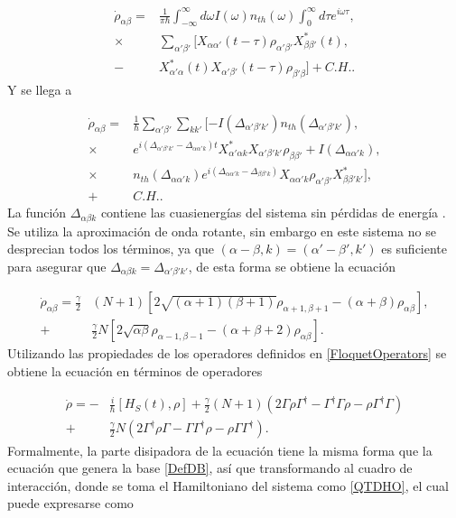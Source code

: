 \documentclass[a4paper,10pt]{report}
\begin{document}
\begin{align*}
\dot{\rho}_{\alpha \beta} =& \frac{1}{\pi \hbar} \int_{-\infty}^\infty d\omega I(\omega)n_{th}(\omega) \int_0 ^{\infty} d\tau e^{i\omega \tau}, \\
 \times & \sum_{\alpha' \beta '} [X_{\alpha \alpha'}(t-\tau)\rho_{\alpha' \beta'}X^* _{\beta \beta'}(t),\\
 -& X^* _{\alpha' \alpha}(t) X_{\alpha' \beta'}(t-\tau)\rho_{\beta' \beta}] + C.H..
\end{align*} Y se llega a

\begin{align*}
\dot{\rho}_{\alpha \beta} =& \frac{1}{\hbar} \sum_{\alpha' \beta'}\sum_{k k'}[-I(\Delta_{\alpha' \beta' k'}) n_{th} (\Delta_{\alpha' \beta' k'}),\\
\times & e^{i(\Delta_{\alpha' \beta' k'}-\Delta_{\alpha \alpha' k})t} X^*_{\alpha' \alpha k}X_{\alpha' \beta' k'}\rho_{\beta \beta'} + I(\Delta_{\alpha \alpha' k}),\\
\times & n_{th}(\Delta_{\alpha \alpha' k}) e^{i(\Delta_{\alpha \alpha' k}-\Delta_{\beta \beta' k})}X_{\alpha \alpha' k} \rho_{\alpha' \beta'}X^*_{\beta \beta' k'}],\\
+& C. H..  
\end{align*} La función $\Delta_{\alpha \beta k}$ contiene las cuasienergías del sistema sin pérdidas de energía \cite{HanngiDQS}. Se utiliza la aproximación de onda rotante, sin embargo en este sistema no se desprecian todos los términos, ya que $(\alpha-\beta,k)=(\alpha'-\beta',k')$ es suficiente para asegurar que $\Delta_{\alpha \beta k}=\Delta_{\alpha' \beta' k'}$, de esta forma se obtiene la ecuación

\begin{align*}
\dot{\rho}_{\alpha \beta} = \frac{\gamma}{2}&(N+1)[2\sqrt{(\alpha+1)(\beta + 1)}\rho_{\alpha+1,\beta+1} - (\alpha + \beta)\rho_{\alpha \beta}],\\
+& \frac{\gamma}{2}N[2\sqrt{\alpha \beta}\rho_{\alpha-1,\beta-1} - (\alpha + \beta + 2)\rho_{\alpha \beta}].
\end{align*}Utilizando las propiedades de los operadores definidos en \eqref{FloquetOperators} se obtiene la ecuación en términos de operadores

\begin{align*}
\dot{\rho} = -&\frac{i}{\hbar}[H_S (t),\rho] + \frac{\gamma}{2}(N+1)(2\Gamma\rho\Gamma^\dagger - \Gamma^\dagger\Gamma \rho - \rho \Gamma^\dagger \Gamma )\\
 +& \frac{\gamma}{2}N(2\Gamma^\dagger \rho \Gamma - \Gamma \Gamma^\dagger \rho - \rho \Gamma\Gamma^\dagger).
\end{align*} Formalmente, la parte disipadora de la ecuación tiene la misma forma que la ecuación que genera la base \eqref{DefDB}, así que transformando al cuadro de interacción, donde se toma el Hamiltoniano del sistema como \eqref{QTDHO}, el cual puede expresarse como\cite{BrownPT} 
\end{document}
